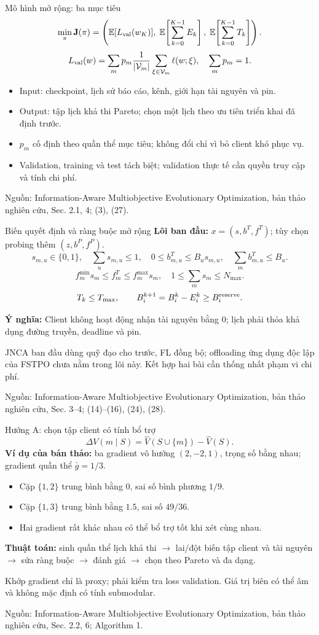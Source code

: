 \documentclass[10pt,aspectratio=43]{beamer}
\newcommand{\source}[1]{\par\vfill{\fontsize{5.8}{7}\selectfont\color{Muted}Nguồn: #1\par}}
\newcommand{\eqmeaning}[1]{\par\medskip\textcolor{HustRed}{\textbf{Ý nghĩa:}} #1\par}
\newcommand{\noteonly}[1]{\par{\footnotesize\color{Muted}#1\par}}
\begin{document}
\begin{frame}[t]{Mô hình mở rộng: ba mục tiêu}\relax
\small
\[\min_{\pi}\mathbf J(\pi)=\left(
\mathbb E[L_{\rm val}(w_K)],\;
\mathbb E\!\left[\sum_{k=0}^{K-1}E_k\right],\;
\mathbb E\!\left[\sum_{k=0}^{K-1}T_k\right]\right).\]
\[L_{\rm val}(w)=\sum_m p_m\frac1{|\mathcal V_m|}
\sum_{\xi\in\mathcal V_m}\ell(w;\xi),\quad \sum_m p_m=1.\]
\begin{itemize}\item Input: checkpoint, lịch sử báo cáo, kênh, giới hạn tài nguyên và pin.
\item Output: tập lịch khả thi Pareto; chọn một lịch theo ưu tiên triển khai đã định trước.
\item $p_m$ cố định theo quần thể mục tiêu; không đổi chỉ vì bỏ client khó phục vụ.
\item Validation, training và test tách biệt; validation thực tế cần quyền truy cập và tính chi phí.
\end{itemize}
\source{Information-Aware Multiobjective Evolutionary Optimization, bản thảo nghiên cứu, Sec. 2.1, 4; (3), (27).}
\end{frame}

\begin{frame}[t]{Biến quyết định và ràng buộc mở rộng}\relax
\small
\textbf{Lõi ban đầu:} $x=(s,b^T,f^T)$; tùy chọn probing thêm $(z,b^P,f^P)$.
\[s_{m,u}\in\{0,1\},\quad\sum_u s_{m,u}\le1,\quad
0\le b^T_{m,u}\le B_u s_{m,u},\quad\sum_m b^T_{m,u}\le B_u.\]
\[f_m^{\min}s_m\le f_m^T\le f_m^{\max}s_m,\quad
1\le\sum_m s_m\le N_{\max}.\]
\[T_k\le T_{\max},\qquad B_i^{k+1}=B_i^k-E_i^k\ge B_i^{\rm reserve}.\]
\eqmeaning{Client không hoạt động nhận tài nguyên bằng 0; lịch phải thỏa khả dụng đường truyền, deadline và pin.}
\noteonly{JNCA ban đầu dùng quỹ đạo cho trước, FL đồng bộ; offloading ứng dụng độc lập của FSTPO chưa nằm trong lõi này. Kết hợp hai bài cần thống nhất phạm vi chi phí.}
\source{Information-Aware Multiobjective Evolutionary Optimization, bản thảo nghiên cứu, Sec. 3--4; (14)--(16), (24), (28).}
\end{frame}

\begin{frame}[t]{Hướng A: chọn tập client có tính bổ trợ}\relax
\small
\[\Delta V(m\mid S)=\widehat V(S\cup\{m\})-\widehat V(S).\]
\textbf{Ví dụ của bản thảo:} ba gradient vô hướng $(2,-2,1)$, trọng số bằng nhau; gradient quần thể $\bar g=1/3$.
\begin{itemize}\item Cặp $\{1,2\}$ trung bình bằng $0$, sai số bình phương $1/9$.
\item Cặp $\{1,3\}$ trung bình bằng $1.5$, sai số $49/36$.
\item Hai gradient rất khác nhau có thể bổ trợ tốt khi xét cùng nhau.
\end{itemize}
\textbf{Thuật toán:} sinh quần thể lịch khả thi $\to$ lai/đột biến tập client và tài nguyên $\to$ sửa ràng buộc $\to$ đánh giá $\to$ chọn theo Pareto và đa dạng.
\noteonly{Khớp gradient chỉ là proxy; phải kiểm tra loss validation. Giá trị biên có thể âm và không mặc định có tính submodular.}
\source{Information-Aware Multiobjective Evolutionary Optimization, bản thảo nghiên cứu, Sec. 2.2, 6; Algorithm 1.}
\end{frame}
\end{document}
